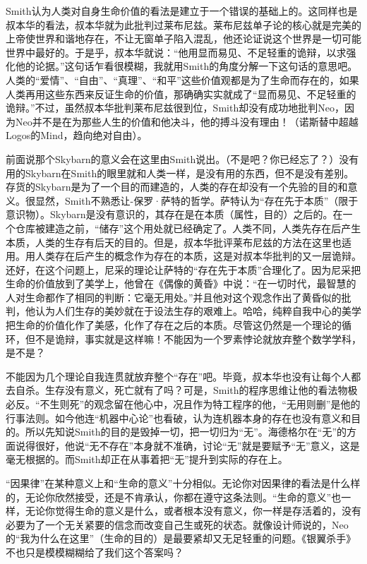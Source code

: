 \documentclass[UTF8]{ctexart}
\begin{document}
Smith认为人类对自身生命价值的看法是建立于一个错误的基础上的。这同样也是叔本华的看法，叔本华就为此批判过莱布尼兹。莱布尼兹单子论的核心就是完美的上帝使世界和谐地存在，不让无窗单子陷入混乱，他还论证说这个世界是一切可能世界中最好的。于是乎，叔本华就说：“他用显而易见、不足轻重的诡辩，以求强化他的论据。”这句话乍看很模糊，我就用Smith的角度分解一下这句话的意思吧。人类的“爱情”、“自由”、“真理”、“和平”这些价值观都是为了生命而存在的，如果人类再用这些东西来反证生命的价值，那确确实实就成了“显而易见、不足轻重的诡辩。”不过，虽然叔本华批判莱布尼兹很到位，Smith却没有成功地批判Neo，因为Neo并不是在为那些人生的价值和他决斗，他的搏斗没有理由！（诺斯替中超越Logos的Mind，趋向绝对自由）。

前面说那个Skybarn的意义会在这里由Smith说出。（不是吧？你已经忘了？）没有用的Skybarn在Smith的眼里就和人类一样，是没有用的东西，但不是没有差别。存货的Skybarn是为了一个目的而建造的，人类的存在却没有一个先验的目的和意义。很显然，Smith不熟悉让-保罗·萨特的哲学。萨特认为“存在先于本质”（限于意识物）。Skybarn是没有意识的，其存在是在本质（属性，目的）之后的。在一个仓库被建造之前，“储存”这个用处就已经确定了。人类不同，人类先存在后产生本质，人类的生存有后天的目的。但是，叔本华批评莱布尼兹的方法在这里也适用。用人类存在后产生的概念作为存在的本质，这是对叔本华批判的又一层诡辩。还好，在这个问题上，尼采的理论让萨特的“存在先于本质”合理化了。因为尼采把生命的价值放到了美学上，他曾在《偶像的黄昏》中说：“在一切时代，最智慧的人对生命都作了相同的判断：它毫无用处。”并且他对这个观念作出了黄昏似的批判，他认为人们生存的美妙就在于设法生存的艰难上。哈哈，纯粹自我中心的美学把生命的价值化作了美感，化作了存在之后的本质。尽管这仍然是一个理论的循环，但不是诡辩，事实就是这样嘛！不能因为一个罗素悖论就放弃整个数学学科，是不是？

不能因为几个理论自我连贯就放弃整个“存在”吧。毕竟，叔本华也没有让每个人都去自杀。生存没有意义，死亡就有了吗？可是，Smith的程序思维让他的看法物极必反。“不生则死”的观念留在他心中，况且作为特工程序的他，“无用则删”是他的行事法则。如今他连“机器中心论”也看破，认为连机器本身的存在也没有意义和目的。所以先知说Smith的目的是毁掉一切，把一切归为“无”。海德格尔在“无”的方面说得很好，他说“无不存在”本身就不准确，讨论“无”就是要赋予“无”意义，这是毫无根据的。而Smith却正在从事着把“无”提升到实际的存在上。

“因果律”在某种意义上和“生命的意义”十分相似。无论你对因果律的看法是什么样的，无论你欣然接受，还是不肯承认，你都在遵守这条法则。“生命的意义”也一样，无论你觉得生命的意义是什么，或者根本没有意义，你一样是存活着的，没有必要为了一个无关紧要的信念而改变自己生或死的状态。就像设计师说的，Neo的“我为什么在这里”（生命的目的）是最要紧却又无足轻重的问题。《银翼杀手》不也只是模模糊糊给了我们这个答案吗？
\end{document}
